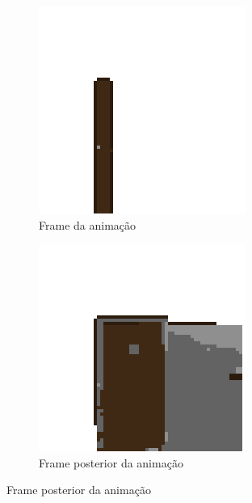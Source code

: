 \begin{figure}[htbp]
    \centering
    \caption{\small Frames da animação gerada pelo prompt 1}
    \label{fig:pixieHaus1}
    \begin{subfigure}{0.45\linewidth}
        \includegraphics[width=1\linewidth]{figs/pixieHaus/2frame1.PNG}
        \caption{\small Frame da animação}
        \label{fig:pixieHaus1a}
    \end{subfigure}
    \begin{subfigure}{0.45\linewidth}
        \includegraphics[width=1\linewidth]{figs/pixieHaus/2frame2.PNG}
        \caption{\small Frame posterior da animação}
        \label{fig:pixieHaus1b}
    \end{subfigure}
\end{figure}

